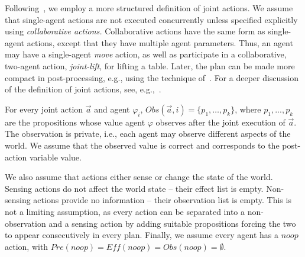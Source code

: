 \documentclass[letterpaper]{article} %
\theoremstyle{definition}
\begin{document}
Following~\citet{IMAP}, we employ a more structured definition of joint actions.
We assume that single-agent actions are not executed concurrently unless specified explicitly using
{\em collaborative actions.} Collaborative actions have the same form as single-agent actions, except that they have multiple agent parameters.
Thus, an agent may have a single-agent {\em move} action, as well as participate in a
collaborative, two-agent action, {\em joint-lift}, for lifting a table.
Later, the plan can be made more
compact in post-processing, e.g., using the technique of~\citet{CJR14}. For a deeper discussion of the definition of joint actions, see, e.g.,~\citep{ShekharB18,ShekharB20}.

For every joint action $\vec{a}$ and agent $\varphi_i$, $\mathit{Obs}(\vec{a},i)=\{p_1,\ldots,p_k\}$, where $p_1,...,p_k$ are the propositions whose value agent $\varphi$ observes after the joint execution of $\vec{a}$. The observation is private, i.e., each agent may observe different aspects of the world. We assume that the observed value is correct and corresponds to the post-action variable value.

We also assume that actions either sense or change the state of the world. Sensing actions do not affect the world state --  their effect list is empty.  Non-sensing actions provide
no information -- their observation list is empty. This is not a limiting assumption, as every action can be separated into a non-observation and a sensing action by adding suitable propositions forcing the two to appear consecutively in every plan. Finally, we assume every agent has a $noop$ action, with $\mathit{Pre}(noop)=\mathit{Eff}(noop) =\mathit{Obs}(noop)= \emptyset$.
\end{document}
